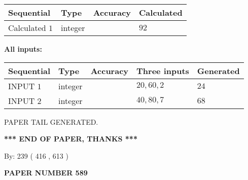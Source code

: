\documentclass[12pt]{article}
\begin{document}
   
   
   
\noindent{}
   
   
  
  
\noindent\begin{tabular}{|l|l|l|l|}
\hline
 Sequential & Type & Accuracy & Calculated \\ 
\hline
 
 
  Calculated $  1 $ & integer &  & 
  $ 92 $ 
 \\  \hline  
 \end{tabular}
   
   
   
   
\noindent\vspace{0.1in}\hspace{-0.08in} {\textbf{\Large{All inputs: }}}
   
   
  
  
\noindent\begin{tabular}{|l|l|l|l|l|}
\hline
 Sequential & Type & Accuracy & Three inputs & Generated \\ 
\hline
 
 
  INPUT $  1 $ & integer &  & $
 20
 , 
 60
 , 
 2
 $ & $ 24 $ 
 \\  \hline  
 
 
  INPUT $  2 $ & integer &  & $
 40
 , 
 80
 , 
 7
 $ & $ 68 $ 
 \\  \hline  
 \end{tabular}
   
   
   
   
   
   
 \vspace{0.2in}
 
   
   
\vspace{2.0in} PAPER TAIL GENERATED.
   
   
   
   
\vspace{1.0in} 
{\textbf{\large{ *** END OF PAPER, THANKS *** }}} 
   
   
\hspace{1.0in} By: 
 239 ( 416 ,  613 )
   
   
   
   
\newpage 
\setcounter{page}{ 
   589001 } 
   
   
   
   
 {\textbf{ \Large{ PAPER NUMBER  589  }}}
   
\end{document}

